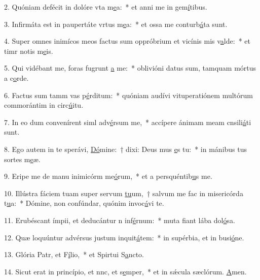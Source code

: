 2. Quóniam defécit in dolóre vta m\uline{e}a:~* et anni me in gem\uline{í}tibus.\par 
3. Infirmáta est in paupertáte vrtus m\uline{e}a:~* et ossa me conturb\uline{á}ta sunt.\par 
4. Super omnes inimícos meos factus sum oppróbrium et vicínis mis v\uline{a}lde:~* et timr notis m\uline{e}is.\par 
5. Qui vidébant me, foras fugrunt \uline{a} me:~* oblivióni datus sum, tamquam mórtus a c\uline{o}rde.\par 
6. Factus sum tamm vas p\uline{é}rditum:~* quóniam audívi vituperatiónem multórum commorántim in circ\uline{ú}itu.\par 
7. In eo dum convenírent siml adv\uline{é}rsum me,~* accípere ánimam meam cnsili\uline{á}ti sunt.\par 
8. Ego autem in te sperávi, \uline{Dó}mine:~† dixi: Deus mus \uline{e}s tu:~* in mánibus tus sortes m\uline{e}æ.\par 
9. Eripe me de manu inimicórm me\uline{ó}rum,~* et a persquéntib\uline{u}s me.\par 
10. Illústra fáciem tuam super servum \uline{tu}um,~† salvum me fac in misericórda t\uline{u}a:~* Dómine, non confúndar, quónim invoc\uline{á}vi te.\par 
11. Erubéscant ímpii, et deducántur n inf\uline{é}rnum:~* muta fiant lába dol\uline{ó}sa.\par 
12. Quæ loquúntur advérsus justum inquit\uline{á}tem:~* in supérbia, et in busi\uline{ó}ne.\par 
13. Glória Patr, et F\uline{í}lio,~* et Spirtui S\uline{a}ncto.\par 
14. Sicut erat in princípio, et nnc, et s\uline{e}mper,~* et in sǽcula sæclórum. \uline{A}men.\par 
